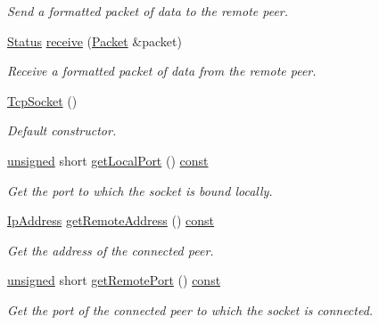 \begin{DoxyCompactItemize}
\begin{DoxyCompactList}\small\item\em Send a formatted packet of data to the remote peer. \end{DoxyCompactList}\item 
\hyperlink{classsf_1_1_socket_a51bf0fd51057b98a10fbb866246176dc}{Status} \hyperlink{classsf_1_1_tcp_socket_aa655352609bc9804f2baa020df3e7331}{receive} (\hyperlink{classsf_1_1_packet}{Packet} \&packet)
\begin{DoxyCompactList}\small\item\em Receive a formatted packet of data from the remote peer. \end{DoxyCompactList}\item 
\hyperlink{classsf_1_1_tcp_socket_a62a9bf81fd7f15fedb29fd1348483236}{Tcp\-Socket} ()
\begin{DoxyCompactList}\small\item\em Default constructor. \end{DoxyCompactList}\item 
\hyperlink{curses_8priv_8h_aca40206900cfc164654362fa8d4ad1e6}{unsigned} short \hyperlink{classsf_1_1_tcp_socket_ab47eeb1cb71f2f251a83bc823773f1b3}{get\-Local\-Port} () \hyperlink{term__entry_8h_a57bd63ce7f9a353488880e3de6692d5a}{const} 
\begin{DoxyCompactList}\small\item\em Get the port to which the socket is bound locally. \end{DoxyCompactList}\item 
\hyperlink{classsf_1_1_ip_address}{Ip\-Address} \hyperlink{classsf_1_1_tcp_socket_a7904ca6ab9e018021e305a3aeb7a1b9a}{get\-Remote\-Address} () \hyperlink{term__entry_8h_a57bd63ce7f9a353488880e3de6692d5a}{const} 
\begin{DoxyCompactList}\small\item\em Get the address of the connected peer. \end{DoxyCompactList}\item 
\hyperlink{curses_8priv_8h_aca40206900cfc164654362fa8d4ad1e6}{unsigned} short \hyperlink{classsf_1_1_tcp_socket_abc05220e06f1522144cecab822e79296}{get\-Remote\-Port} () \hyperlink{term__entry_8h_a57bd63ce7f9a353488880e3de6692d5a}{const} 
\begin{DoxyCompactList}\small\item\em Get the port of the connected peer to which the socket is connected. \end{DoxyCompactList}\item 

\end{DoxyCompactItemize}
